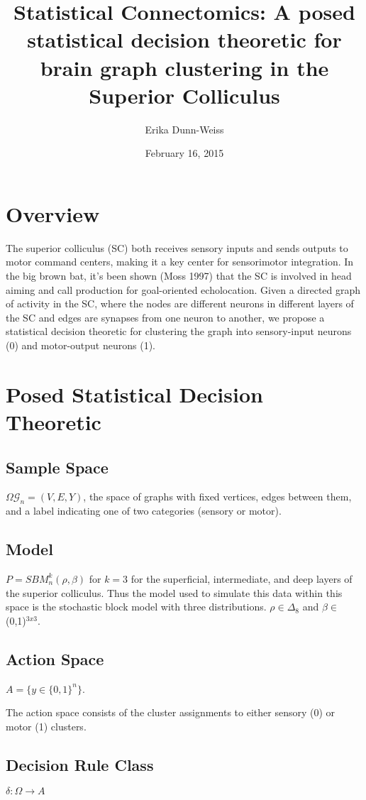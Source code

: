 \documentclass[psamsfonts]{amsart}
\title{Statistical Connectomics: A posed statistical decision theoretic for brain graph clustering in the Superior Colliculus}
\author{Erika Dunn-Weiss}
\date{February 16, 2015}
\theoremstyle{definition}
\theoremstyle{remark}
\numberwithin{equation}{section}
\begin{document}
\maketitle

\section{Overview}

The superior colliculus (SC) both receives sensory inputs and sends outputs to motor command centers, making it a key center for sensorimotor integration. In the big brown bat, it's been shown (Moss 1997) that the SC  is involved in head aiming and call production for goal-oriented echolocation. Given a directed graph of activity in the SC, where the nodes are different neurons in different layers of the SC and edges are synapses from one neuron to another, we propose a statistical decision theoretic for clustering the graph into sensory-input neurons (0) and motor-output neurons (1).


\section{Posed Statistical Decision Theoretic}

\subsection{Sample Space}
$\Omega \mathcal{G}_n = (V,E,Y)$, the space of graphs with fixed vertices, edges between them, and a label indicating one of two categories (sensory or motor).
\subsection{Model}
$P = SBM^k_n(\rho, \beta)$ for $k = 3$ for the superficial, intermediate, and deep layers of the superior colliculus. Thus the model used to simulate this data within this space is the stochastic block model with three distributions. $\rho \in \Delta_8$ and $\beta \in$ (0,1)$^{3 x 3}$.
\subsection{Action Space}
$A = \{y \in \{0,1\}^n\}$. 

The action space consists of the cluster assignments to either sensory (0) or motor (1) clusters.
\subsection{Decision Rule Class} 
$\delta: \Omega \to A$
\end{document}
